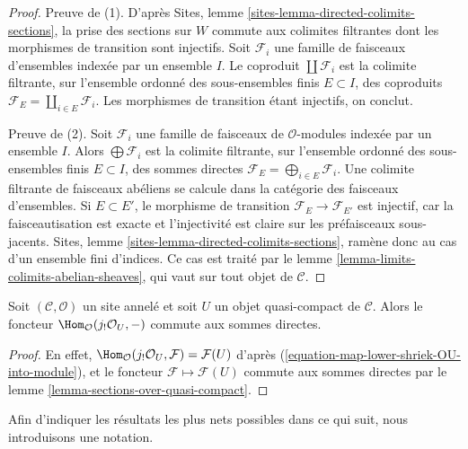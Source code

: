 \begin{proof}
Preuve de (1). D'après Sites, lemme
\ref{sites-lemma-directed-colimits-sections}, la prise des sections sur $W$
commute aux colimites filtrantes dont les morphismes de transition sont
injectifs. Soit $\mathcal{F}_i$ une famille de faisceaux d'ensembles
indexée par un ensemble $I$. Le coproduit $\coprod \mathcal{F}_i$ est la
colimite filtrante, sur l'ensemble ordonné des sous-ensembles finis
$E \subset I$, des coproduits
$\mathcal{F}_E = \coprod_{i \in E} \mathcal{F}_i$. Les morphismes de
transition étant injectifs, on conclut.

\medskip\noindent

Preuve de (2). Soit $\mathcal{F}_i$ une famille de faisceaux de
$\mathcal{O}$-modules indexée par un ensemble $I$. Alors
$\bigoplus \mathcal{F}_i$ est la colimite filtrante, sur l'ensemble ordonné
des sous-ensembles finis $E \subset I$, des sommes directes
$\mathcal{F}_E = \bigoplus_{i \in E} \mathcal{F}_i$. Une colimite filtrante
de faisceaux abéliens se calcule dans la catégorie des faisceaux d'ensembles.
Si $E \subset E'$, le morphisme de transition
$\mathcal{F}_E \to \mathcal{F}_{E'}$ est injectif, car la faisceautisation
est exacte et l'injectivité est claire sur les préfaisceaux sous-jacents.
Sites, lemme \ref{sites-lemma-directed-colimits-sections}, ramène donc au
cas d'un ensemble fini d'indices. Ce cas est traité par le lemme
\ref{lemma-limits-colimits-abelian-sheaves}, qui vaut sur tout objet de
$\mathcal{C}$.

\end{proof}

\begin{lemma}

\label{lemma-quasi-compact-hom-from}
Soit $(\mathcal{C}, \mathcal{O})$ un site annelé et soit $U$ un objet
quasi-compact de $\mathcal{C}$. Alors le foncteur
$\Hom_\mathcal{O}(j_!\mathcal{O}_U, -)$ commute aux sommes directes.
\end{lemma}

\begin{proof}
En effet, $\Hom_\mathcal{O}(j_!\mathcal{O}_U, \mathcal{F}) =
\mathcal{F}(U)$ d'après
(\ref{equation-map-lower-shriek-OU-into-module}), et le foncteur
$\mathcal{F} \mapsto \mathcal{F}(U)$ commute aux sommes directes par le
lemme \ref{lemma-sections-over-quasi-compact}.
\end{proof}

\noindent
Afin d'indiquer les résultats les plus nets possibles dans ce qui suit, nous introduisons une notation.

